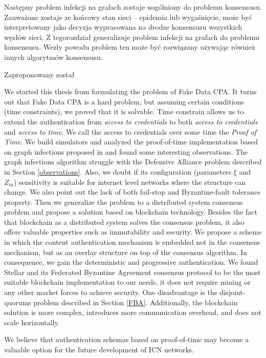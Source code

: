 Następny problem infekcji na grafach zostaje uogólniony do problemu konsensusu. Zauważone zostaje ze końcowy stan sieci -- epidemia lub wygaśnięcie, może być interpretowany jako decyzja wypracowana na drodze konsensusu wszystkich węzłów sieci. Z tegorozdział generalizuje problem infekcji na grafach do problemu konsensusu. Wezły powodu problem ten może być rozwiązany używając również innych algorytmów konsensusu.

Zaproponowany został 

We started this thesis from formulating the problem of Fake Data CPA. It turns out that Fake Data CPA is a hard problem, but assuming certain conditions (time constraints), we proved that it is solvable. Time constrain allows us to extend the authentication from \textit{access to credentials} to both \textit{access to credentials} and \textit{access to time}. We call the access to credentials over some time the \textit{Proof of Time}. We build simulators and analyzed the proof-of-time implementation based on graph infections proposed in \cite{konorski2019mitigating} and found some interesting observations. The graph infections algorithm struggle with the Defensive Alliance problem described in Section \ref{observations}. Also, we doubt if its configuration (parameters $\xi$ and $Z_{ia}$) sensitivity is suitable for internet level networks where the structure can change. We also point out the lack of both fail-stop and Byzantine-fault tolerance property. Then we generalize the problem to a distributed system consensus problem and propose a solution based on blockchain technology. Besides the fact that blockchain as a distributed system solves the consensus problem, it also offers valuable properties such as immutability and security. We propose a scheme in which the content authentication mechanism is embedded not in the consensus mechanism, but as an overlay structure on top of the consensus algorithm. In consequence, we gain the deterministic and progressive authentication. We found Stellar and its Federated Byzantine Agreement consensus protocol to be the most suitable blockchain implementation to our needs, it does not require mining or any other market forces to achieve security. One disadvantage is the disjoint-quorums problem described in Section \ref{FBA}. Additionally, the blockchain solution is more complex, introduces more communication overhead, and does not scale horizontally.

We believe that authentication schemas based on proof-of-time may become a valuable option for the future development of ICN networks. 

